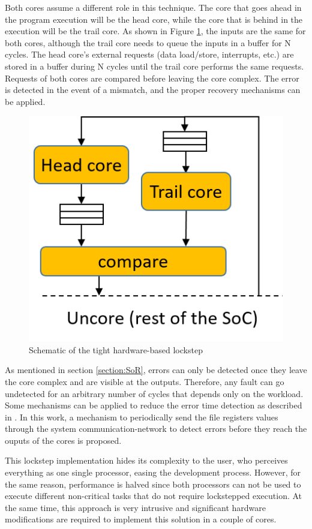 Both cores assume a different role in this technique. The core that goes ahead in the program execution will be the head core, while the core that is behind in the execution will be the trail core. As shown in Figure \ref{fig:HWlockstep}, the inputs are the same for both cores, although the trail core needs to queue the inputs in a buffer for N cycles. The head core's external requests (data load/store, interrupts, etc.) are stored in a buffer during N cycles until the trail core performs the same requests. Requests of both cores are compared before leaving the core complex. The error is detected in the event of a mismatch, and the proper recovery mechanisms can be applied.

\begin{figure}[h]
    \centering
    \includegraphics[scale=1]{img/HWlockstep.png}
    \caption{Schematic of the tight hardware-based lockstep}
    \label{fig:HWlockstep}
\end{figure}

As mentioned in section \ref{section:SoR}, errors can only be detected once they leave the core complex and are visible at the outputs. Therefore, any fault can go undetected for an arbitrary number of cycles that depends only on the workload. Some mechanisms can be applied to reduce the error time detection as described in \cite{hernandez2014live}. In this work, a mechanism to periodically send the file registers values through the system communication-network to detect errors before they reach the ouputs of the cores is proposed.

This lockstep implementation hides its complexity to the user, who perceives everything as one single processor, easing the development process. However, for the same reason, performance is halved since both processors can not be used to execute different non-critical tasks that do not require lockstepped execution. At the same time, this approach is very intrusive and significant hardware modifications are required to implement this solution in a couple of cores.

